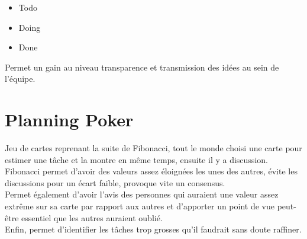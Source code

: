 \documentclass{report}
\begin{document}
		\begin{itemize}
			\item Todo
			\item Doing
			\item Done\\
		\end{itemize}

		Permet un gain au niveau transparence et transmission des idées au sein de l'équipe.\\

	\section{Planning Poker}

		Jeu de cartes reprenant la suite de Fibonacci, tout le monde choisi une carte pour estimer une tâche et la montre en même temps, ensuite il y a discussion.\\

		Fibonacci permet d'avoir des valeurs assez éloignées les unes des autres, évite les discussions pour un écart faible, provoque vite un consensus.\\
		Permet également d'avoir l'avis des personnes qui auraient une valeur assez extrême sur sa carte par rapport aux autres et d'apporter un point de vue peut-être essentiel que les autres auraient oublié.\\

		Enfin, permet d'identifier les tâches trop grosses qu'il faudrait sans doute raffiner.\\
\end{document}
